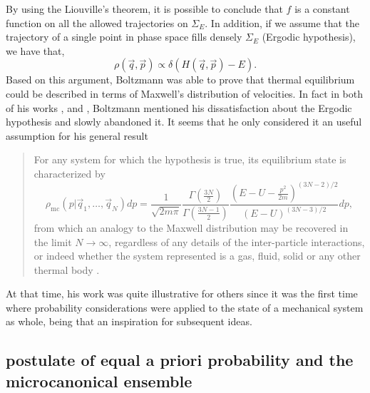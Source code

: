 \indent By using the Liouville's theorem, it is possible to conclude that $f$ is a constant function on all the allowed trajectories on $\Sigma_{E}$. In addition, if we assume that the trajectory of a single point in phase space fills densely $\Sigma_E$ (Ergodic hypothesis), we have that, 
\begin{equation}
\rho(\vec{q},\vec{p})\propto \delta(H(\vec{q},\vec{p})-E).
\label{CH1:Liouville_equation}
\end{equation}
Based on this argument, Boltzmann was able to prove that thermal equilibrium could be described in terms of Maxwell's distribution of velocities. In fact in both of his works \cite{boltzmann_zur_1871}, and \cite{boltzmann_einige_1871}, Boltzmann mentioned his dissatisfaction about the Ergodic hypothesis and slowly abandoned it. It seems that he only considered it an useful assumption for his general result
\begin{quote}
For any system for which the hypothesis is true, its equilibrium state is characterized by 
\begin{equation}
\rho_{\mathrm{mc}}\left(p | \vec{q}_{1}, \ldots, \vec{q}_{N}\right) d p=\frac{1}{\sqrt{2 m \pi}} \frac{\Gamma\left(\frac{3N}{2}\right)}{\Gamma\left(\frac{3N-1}{2}\right)} \frac{\left(E-U-\frac{p^{2}}{2 m}\right)^{(3N-2) / 2}}{(E-U)^{(3N-3) / 2}} d p,
\end{equation}
from which an analogy to the Maxwell distribution may be recovered in the limit $N \to \infty$, regardless of any details of the inter-particle interactions, or indeed whether the system represented is a gas, fluid, solid or any other thermal body \cite{boltzmann_uber_1866}.
\end{quote}
\indent At that time, his work was quite illustrative for others since it was the first time where probability considerations were applied to the state of a mechanical system as whole, being that an inspiration for subsequent ideas. 

\subsection{postulate of equal a priori probability and the microcanonical ensemble}




